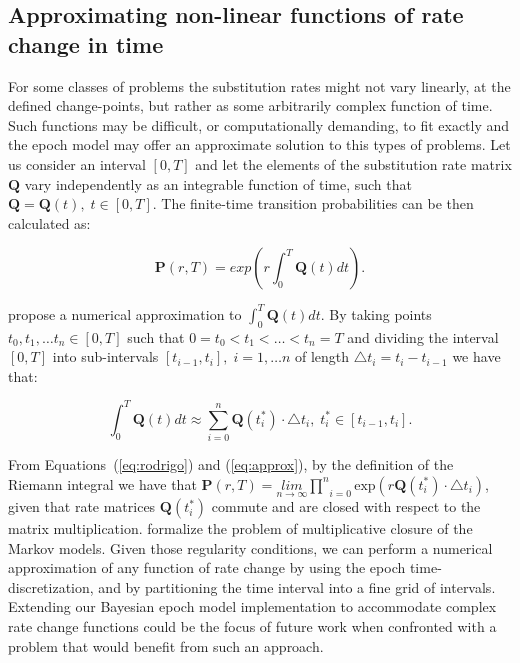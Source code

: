 \subsection{Approximating non-linear functions of rate change in time\label{sub:nonlinear}}

For some classes of problems the substitution rates might not vary linearly, at the defined change-points, but rather as some arbitrarily complex function of time. 
Such functions may be difficult, or computationally demanding, to fit exactly and the epoch model may offer an approximate solution to this types of problems.
Let us consider an interval $\left[0,T\right]$ and let the elements of the substitution rate matrix $\mathbf{Q}$ vary independently as an integrable function of time, such that $\mathbf{Q}=\mathbf{Q}(t),\; t\in\left[0,T\right]$. 
The finite-time transition probabilities can be then calculated as: 

\begin{equation}
\ensuremath{\mathbf{P}}(r,T)=exp\left(r\int_{0}^{T}\mathbf{Q}(t)dt\right).\label{eq:rodrigo}
\end{equation}

\noindent
\citet{Rodrigo2008} propose a numerical approximation to $\int_{0}^{T}\mathbf{Q}(t)dt$. 
By taking points $t_{0},t_{1},\ldots t_{n}\in[0,T]$ such that $0=t_{0}<t_{1}<\ldots<t_{n}=T$ and dividing the interval $\left[0,T\right]$ into sub-intervals $\left[t_{i-1},t_{i}\right],\; i=1,\ldots n$ of length $\triangle t_{i}=t_{i}-t_{i-1}$ we have that:   

\begin{equation}
\int_{0}^{T}\mathbf{Q}(t)dt\approx\underset{i=0}{\overset{n}{\sum}}\mathbf{Q}(t_{i}^{*})\cdot\triangle t_{i},\; t_{i}^{*}\in[t_{i-1},t_{i}].\label{eq:approx}
\end{equation}

\noindent
From Equations~(\ref{eq:rodrigo}) and (\ref{eq:approx}), by the definition of the Riemann integral we have that $\mathbf{P}(r,T)=\underset{n\rightarrow\infty}{lim}\underset{i=0}{\overset{n}{\prod}}\text{exp}\left(r\mathbf{Q}(t_{i}^{*})\cdot\triangle t_{i}\right)$, given that rate matrices $\mathbf{Q}(t_{i}^{*})$ commute 
and are closed with respect to the matrix multiplication.
\citet{Sumner2012} formalize the problem of multiplicative closure of the Markov models. 
Given those regularity conditions, we can perform a numerical approximation of any function of rate change by using the epoch time-discretization, and by partitioning the time interval into a fine grid of intervals.
Extending our Bayesian epoch model implementation to accommodate complex rate change functions could be the focus of future work when confronted with a problem that would benefit from such an approach.

